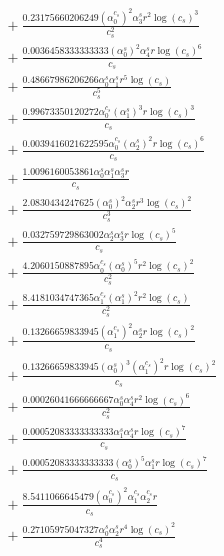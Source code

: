\documentclass[10pt]{article}
\begin{document}
\begin{align*}
&{}  + \frac{0.23175660206249 \left(\alpha_{0}^{c_s}\right)^{2} \alpha_{3}^s r^{2} \log{\left(c_{s} \right)}^{3}}{c_{s}^{2}} \\
&{}  + \frac{0.0036458333333333 \left(\alpha_{0}^s\right)^{2} \alpha_{4}^s r \log{\left(c_{s} \right)}^{6}}{c_{s}} \\
&{}  + \frac{0.48667986206266 \alpha_{0}^s \alpha_{1}^s r^{5} \log{\left(c_{s} \right)}}{c_{s}^{5}} \\
&{}  + \frac{0.99673350120272 \alpha_{0}^{c_s} \left(\alpha_{1}^s\right)^{3} r \log{\left(c_{s} \right)}^{3}}{c_{s}} \\
&{}  + \frac{0.0039416021622595 \alpha_{0}^{c_s} \left(\alpha_{2}^s\right)^{2} r \log{\left(c_{s} \right)}^{6}}{c_{s}} \\
&{}  + \frac{1.0096160053861 \alpha_{0}^s \alpha_{1}^s \alpha_{3}^s r}{c_{s}} \\
&{}  + \frac{2.0830434247625 \left(\alpha_{0}^s\right)^{2} \alpha_{2}^s r^{3} \log{\left(c_{s} \right)}^{2}}{c_{s}^{3}} \\
&{}  + \frac{0.032759729863002 \alpha_{2}^s \alpha_{3}^s r \log{\left(c_{s} \right)}^{5}}{c_{s}} \\
&{}  + \frac{4.2060150887895 \alpha_{0}^{c_s} \left(\alpha_{0}^s\right)^{5} r^{2} \log{\left(c_{s} \right)}^{2}}{c_{s}^{2}} \\
&{}  + \frac{8.4181034747365 \alpha_{1}^{c_s} \left(\alpha_{1}^s\right)^{2} r^{2} \log{\left(c_{s} \right)}}{c_{s}^{2}} \\
&{}  + \frac{0.13266659833945 \left(\alpha_{1}^{c_s}\right)^{2} \alpha_{2}^s r \log{\left(c_{s} \right)}^{2}}{c_{s}} \\
&{}  + \frac{0.13266659833945 \left(\alpha_{0}^s\right)^{3} \left(\alpha_{1}^{c_s}\right)^{2} r \log{\left(c_{s} \right)}^{2}}{c_{s}} \\
&{}  + \frac{0.00026041666666667 \alpha_{0}^s \alpha_{4}^s r^{2} \log{\left(c_{s} \right)}^{6}}{c_{s}^{2}} \\
&{}  + \frac{0.00052083333333333 \alpha_{1}^s \alpha_{4}^s r \log{\left(c_{s} \right)}^{7}}{c_{s}} \\
&{}  + \frac{0.00052083333333333 \left(\alpha_{0}^s\right)^{5} \alpha_{1}^s r \log{\left(c_{s} \right)}^{7}}{c_{s}} \\
&{}  + \frac{8.5411066645479 \left(\alpha_{0}^{c_s}\right)^{2} \alpha_{1}^{c_s} \alpha_{2}^{c_s} r}{c_{s}} \\
&{}  + \frac{0.27105975047327 \alpha_{0}^s \alpha_{2}^s r^{4} \log{\left(c_{s} \right)}^{2}}{c_{s}^{4}} \\

\end{align*}
\end{document}
